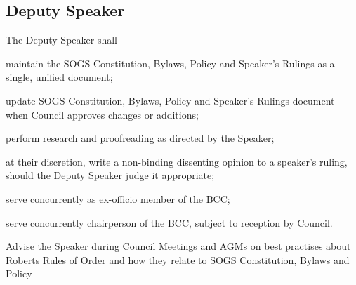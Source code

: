 \subsection{Deputy Speaker}
The Deputy Speaker shall
\begin{longenum}[ label*=\thesubsection.\arabic*., align=left]
\item maintain the SOGS Constitution, Bylaws, Policy and Speaker's Rulings as a single, unified document;
\item update SOGS Constitution, Bylaws, Policy and Speaker's Rulings document when Council approves changes or additions;
\item perform research and proofreading as directed by the Speaker;
\item at their discretion, write a non-binding dissenting opinion to a speaker's ruling, should the Deputy Speaker judge it appropriate;
\item serve concurrently as ex-officio member of the BCC;
\item serve concurrently chairperson of the BCC, subject to reception by Council.
\item Advise the Speaker during Council Meetings and AGMs on best practises about Roberts Rules
of Order and how they relate to SOGS Constitution, Bylaws and Policy
\end{longenum}

\newpage


